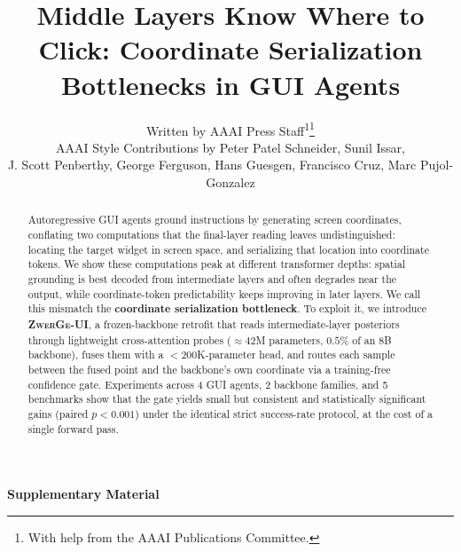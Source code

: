 \documentclass[letterpaper]{article} %
\title{Middle Layers Know Where to Click: Coordinate Serialization Bottlenecks in GUI Agents}
\author{
 Written by AAAI Press Staff\textsuperscript{\rm 1}\thanks{With help from the AAAI Publications Committee.}\\
 AAAI Style Contributions by Peter Patel Schneider,
 Sunil Issar,\\
 J. Scott Penberthy,
 George Ferguson,
 Hans Guesgen,
 Francisco Cruz\equalcontrib\corresponding,
 Marc Pujol-Gonzalez\equalcontrib\corresponding
}
\begin{document}
\maketitle

\begin{abstract}
Autoregressive GUI agents ground instructions by generating screen coordinates, conflating two computations that the final-layer reading leaves undistinguished: locating the target widget in screen space, and serializing that location into coordinate tokens.
We show these computations peak at different transformer depths: spatial grounding is best decoded from intermediate layers and often degrades near the output, while coordinate-token predictability keeps improving in later layers.
We call this mismatch the \textbf{coordinate serialization bottleneck}.
To exploit it, we introduce \textbf{\textsc{ZwerGe-UI}}, a frozen-backbone retrofit that reads intermediate-layer posteriors through lightweight cross-attention probes (${\approx}42$M parameters, $0.5\%$ of an 8B backbone), fuses them with a ${<}200$K-parameter head, and routes each sample between the fused point and the backbone's own coordinate via a training-free confidence gate.
Experiments across 4 GUI agents, 2 backbone families, and 5 benchmarks show that the gate yields small but consistent and statistically significant gains (paired $p{<}0.001$) under the identical strict success-rate protocol, at the cost of a single forward pass.
\end{abstract}











\clearpage
\appendix
\setcounter{section}{0}
\renewcommand{\thesection}{\Alph{section}}
\begin{center}
{\Large\bfseries Supplementary Material}
\end{center}
\vspace{0.6em}



\end{document}
